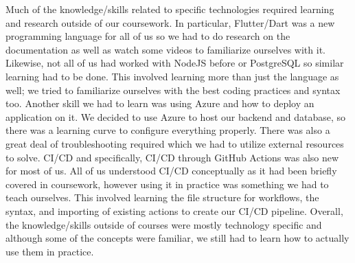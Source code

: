\documentclass{article}
\begin{document}
Much of the knowledge/skills related to specific technologies required learning and research outside of our coursework.
In particular, Flutter/Dart was a new programming language for all of us so we had to do research on the documentation as well
as watch some videos to familiarize ourselves with it. Likewise, not all of us had worked with NodeJS before or PostgreSQL
so similar learning had to be done. This involved learning more than just the language as well; we tried to familiarize ourselves
with the best coding practices and syntax too. Another skill we had to learn was using Azure and how to deploy an application on it.
We decided to use Azure to host our backend and database, so there was a learning curve to configure everything properly. There was
also a great deal of troubleshooting required which we had to utilize external resources to solve. CI/CD and specifically,
CI/CD through GitHub Actions was also new for most of us. All of us understood CI/CD conceptually as it had been briefly
covered in coursework, however using it in practice was something we had to teach ourselves. This involved learning the
file structure for workflows, the syntax, and importing of existing actions to create our CI/CD pipeline. Overall, the knowledge/skills
outside of courses were mostly technology specific and although some of the concepts were familiar, we still had to learn how
to actually use them in practice.
\end{document}
